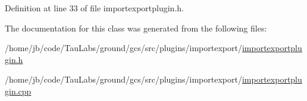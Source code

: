 \-Definition at line 33 of file importexportplugin.\-h.



\-The documentation for this class was generated from the following files\-:\begin{DoxyCompactItemize}
\item 
/home/jb/code/\-Tau\-Labs/ground/gcs/src/plugins/importexport/\hyperlink{importexportplugin_8h}{importexportplugin.\-h}\item 
/home/jb/code/\-Tau\-Labs/ground/gcs/src/plugins/importexport/\hyperlink{importexportplugin_8cpp}{importexportplugin.\-cpp}\end{DoxyCompactItemize}
